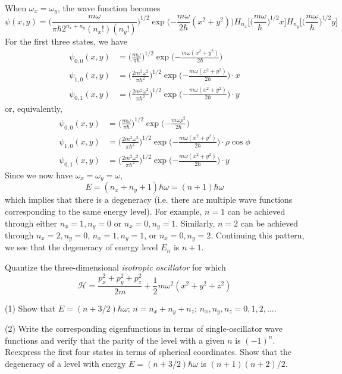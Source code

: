 \documentclass[../principles-of-quantum-mechanics.tex]{subfiles}
\begin{document}
\begin{questions}
\begin{solution}
			When $\omega_x = \omega_y$, the wave function becomes
			$$\psi(x, y) = \Big(\frac{m\omega}{\pi\hbar2^{n_x+n_y}(n_x!)(n_y!)}\Big)^{1/2}\exp\Big({-\frac{m\omega}{2\hbar}}(x^2 + y^2)\Big)H_{n_x}\Big[\Big(\frac{m\omega}{\hbar}\Big)^{1/2}x\Big]H_{n_y}\Big[\Big(\frac{m\omega}{\hbar}\Big)^{1/2}y\Big]$$
			For the first three states, we have
			\begin{align*}
				\psi_{0,0}(x, y) &= \Big(\frac{m\omega}{\pi\hbar}\Big)^{1/2}\exp\Big({-\frac{m\omega(x^2 + y^2)}{2\hbar}}\Big) \\
				\psi_{1,0}(x, y) &= \Big(\frac{2m^2\omega^2}{\pi\hbar^2}\Big)^{1/2}\exp\Big({-\frac{m\omega(x^2 + y^2)}{2\hbar}}\Big)\cdot x \\
				\psi_{0,1}(x, y) &= \Big(\frac{2m^2\omega^2}{\pi\hbar^2}\Big)^{1/2}\exp\Big({-\frac{m\omega(x^2 + y^2)}{2\hbar}}\Big)\cdot y
			\end{align*}
			or, equivalently,
			\begin{align*}
				\psi_{0,0}(x, y) &= \Big(\frac{m\omega}{\pi\hbar}\Big)^{1/2}\exp\Big({-\frac{m\omega\rho^2}{2\hbar}}\Big) \\
				\psi_{1,0}(x, y) &= \Big(\frac{2m^2\omega^2}{\pi\hbar^2}\Big)^{1/2}\exp\Big({-\frac{m\omega(x^2 + y^2)}{2\hbar}}\Big)\cdot \rho\cos\phi \\
				\psi_{0,1}(x, y) &= \Big(\frac{2m^2\omega^2}{\pi\hbar^2}\Big)^{1/2}\exp\Big({-\frac{m\omega(x^2 + y^2)}{2\hbar}}\Big)\cdot y
			\end{align*}
			Since we now have $\omega_x = \omega_y = \omega$,
			$$E = (n_x + n_y + 1)\hbar\omega = (n + 1)\hbar\omega$$
			which implies that there is a degeneracy (i.e. there are multiple wave functions corresponding to the same energy level). For example, $n = 1$ can be achieved through either $n_x = 1, n_y = 0$ or $n_x = 0, n_y = 1$. Similarly, $n = 2$ can be achieved through $n_x = 2, n_y = 0$, $n_x = 1, n_y = 1$, or $n_x = 0, n_y = 2$. Continuing this pattern, we see that the degeneracy of energy level $E_n$ is $n + 1$.
		\end{solution}
		
		\question Quantize the three-dimensional \textit{isotropic oscillator} for which
		$$\mathcal{H} = \frac{p_x^2 + p_y^2 + p_z^2}{2m} + \frac{1}{2}m\omega^2(x^2 + y^2 + z^2)$$
		
		(1) Show that $E = (n + 3/2)\hbar\omega$; $n = n_x + n_y + n_z$; $n_x, n_y, n_z = 0, 1, 2, \dots$.
		
		(2) Write the corresponding eigenfunctions in terms of single-oscillator wave functions and verify that the parity of the level with a given $n$ is $(-1)^n$. Reexpress the first four states in terms of spherical coordinates. Show that the degeneracy of a level with energy $E = (n + 3/2)\hbar\omega$ is $(n + 1)(n + 2)/2$.
		

\end{questions}
\end{document}
